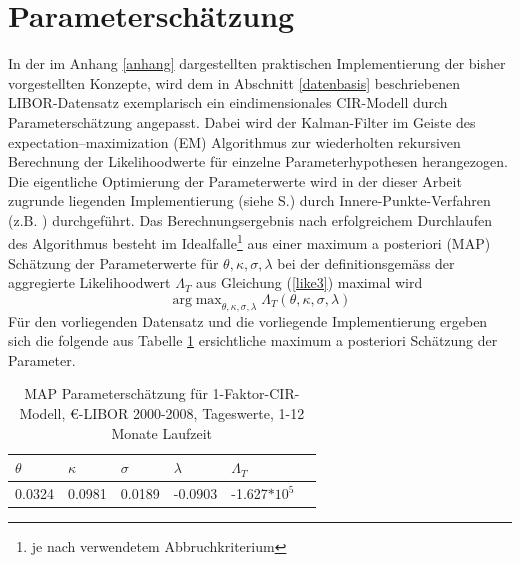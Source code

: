 \documentclass[12pt,a4paper,headsepline,bibliography=totoc,listof=totoc,headinclude=false,footinclude=false,BCOR5mm]{scrreprt} %
\DeclareMathOperator*{\argmax}{arg\!\,max}
\begin{document}
 \section{Parametersch{\"a}tzung}\label{paramscha}
In der im Anhang \ref{anhang} dargestellten praktischen Implementierung der bisher vorgestellten Konzepte, wird dem in Abschnitt \ref{datenbasis} beschriebenen LIBOR-Datensatz exemplarisch ein eindimensionales CIR-Modell durch Parametersch{\"a}tzung angepasst. Dabei wird der Kalman-Filter im Geiste des expectation–maximization (EM) Algorithmus \cite{Dempster1977} zur wiederholten rekursiven Berechnung der Likelihoodwerte f{\"u}r einzelne Parameterhypothesen herangezogen. Die eigentliche Optimierung der Parameterwerte wird in der dieser Arbeit zugrunde liegenden Implementierung (siehe S.\pageref{anhang}) durch Innere-Punkte-Verfahren (z.B. \cite{Waltz2006}) durchgef{\"u}hrt. Das Berechnungsergebnis nach erfolgreichem Durchlaufen des Algorithmus besteht im Idealfalle\footnote{je nach verwendetem Abbruchkriterium} aus einer maximum a posteriori (MAP) Sch{\"a}tzung der Parameterwerte f{\"u}r  $\theta, \kappa,  \sigma, \lambda$ bei der definitionsgem{\"a}ss der aggregierte Likelihoodwert $\Lambda _T$ aus Gleichung (\ref{like3}) maximal wird
\begin{equation}
\argmax_{\theta, \kappa,  \sigma, \lambda} \Lambda _T (\theta, \kappa,  \sigma, \lambda)
\end{equation}
F{\"u}r den vorliegenden Datensatz und die vorliegende Implementierung ergeben sich die folgende aus Tabelle \ref{MAPPara} ersichtliche maximum a posteriori Sch{\"a}tzung der Parameter.
\begin{table}[h!]
\begin{center}
  \begin{tabular}{ | l | l | l | l |l |l |}
    \hline
    $\theta$ & $\kappa$  & $\sigma$ &   $\lambda$ & $\Lambda _T$   \\ \hline
  0.0324  & 0.0981 & 0.0189 & -0.0903  & -1.627$*10^{5}$   \\ \hline
  
    \hline
    \end{tabular}\caption{MAP Parametersch{\"a}tzung f{\"u}r 1-Faktor-CIR-Modell, \euro-LIBOR 2000-2008, Tageswerte, 1-12 Monate Laufzeit}\label{MAPPara}
\end{center}     
\end{table}
\end{document}
